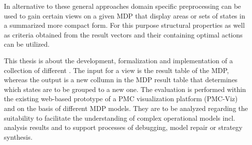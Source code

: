 \documentclass[preview]{standalone}
\begin{document}
In alternative to these general approaches domain specific preprocessing can be used to gain certain views on a given MDP that display areas or sets of states in a summarized more compact form. For this purpose structural properties as well as criteria obtained from the result vectors and their containing optimal actions can be utilized.


This thesis is about the development, formalization and implementation of a collection of different \emph{\viewsN}.
The input for a view is the result table of the MDP, whereas the output is a new collumn in the MDP result table that determines which states are to be grouped to a new one.
The evaluation is performed within the existing web-based prototype of a PMC visualization platform (PMC-Viz) and on the basis of different MDP models. They are to be analyzed regarding the suitability to facilitate the understanding of complex operational models incl. analysis results and to support processes of debugging, model repair or strategy synthesis.
\end{document}

